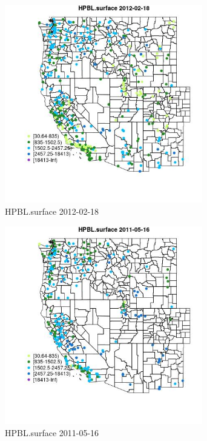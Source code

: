 \begin{figure} 
\centering  
\includegraphics[width=0.77\textwidth]{Code_Outputs/Report_ML_input_PM25_Step4_part_f_de_duplicated_aves_prioritize_24hr_obswNAs_MapObsHPBLsurface2012-02-18.jpg} 
\caption{\label{fig:Report_ML_input_PM25_Step4_part_f_de_duplicated_aves_prioritize_24hr_obswNAsMapObsHPBLsurface2012-02-18}HPBL.surface 2012-02-18} 
\end{figure} 
 

\begin{figure} 
\centering  
\includegraphics[width=0.77\textwidth]{Code_Outputs/Report_ML_input_PM25_Step4_part_f_de_duplicated_aves_prioritize_24hr_obswNAs_MapObsHPBLsurface2011-05-16.jpg} 
\caption{\label{fig:Report_ML_input_PM25_Step4_part_f_de_duplicated_aves_prioritize_24hr_obswNAsMapObsHPBLsurface2011-05-16}HPBL.surface 2011-05-16} 
\end{figure} 
 

